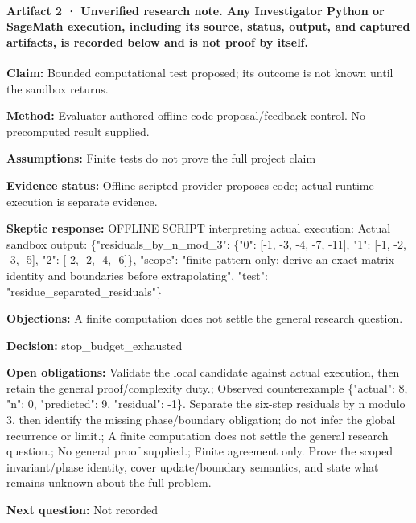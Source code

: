 \documentclass[11pt]{article}
\begin{document}
\paragraph{Artifact 2 · Unverified research note. Any Investigator Python or SageMath execution, including its source, status, output, and captured artifacts, is recorded below and is not proof by itself.}
\textbf{Claim:} Bounded computational test proposed; its outcome is not known until the sandbox returns.\par
\textbf{Method:} Evaluator-authored offline code proposal/feedback control. No precomputed result supplied.\par
\textbf{Assumptions:} Finite tests do not prove the full project claim\par
\textbf{Evidence status:} Offline scripted provider proposes code; actual runtime execution is separate evidence.\par
\textbf{Skeptic response:} OFFLINE SCRIPT interpreting actual execution: Actual sandbox output: \{"residuals\_by\_n\_mod\_3": \{"0": [-1, -3, -4, -7, -11], "1": [-1, -2, -3, -5], "2": [-2, -2, -4, -6]\}, "scope": "finite pattern only; derive an exact matrix identity and boundaries before extrapolating", "test": "residue\_separated\_residuals"\}\par
\textbf{Objections:} A finite computation does not settle the general research question.\par
\textbf{Decision:} stop\_budget\_exhausted\par
\textbf{Open obligations:} Validate the local candidate against actual execution, then retain the general proof/complexity duty.; Observed counterexample \{"actual": 8, "n": 0, "predicted": 9, "residual": -1\}. Separate the six-step residuals by n modulo 3, then identify the missing phase/boundary obligation; do not infer the global recurrence or limit.; A finite computation does not settle the general research question.; No general proof supplied.; Finite agreement only. Prove the scoped invariant/phase identity, cover update/boundary semantics, and state what remains unknown about the full problem.\par
\textbf{Next question:} Not recorded\par
\end{document}
